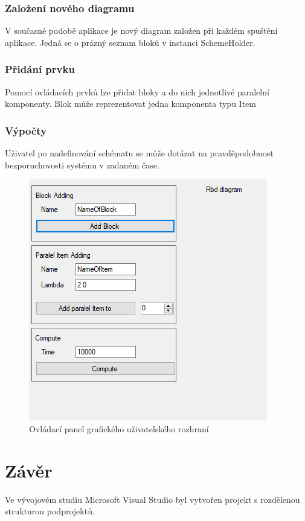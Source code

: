 \documentclass[FM,RP]{tulthesis}
\begin{document}
    \subsection*{Založení nového diagramu}
        V současné podobě aplikace je nový diagram založen při každém spuštění aplikace. Jedná se o prázný seznam bloků v instanci SchemeHolder.
    \subsection*{Přidání prvku}
        Pomocí ovládacích prvků lze přidat bloky a do nich jednotlivé paralelní komponenty. Blok může reprezentovat jedna komponenta typu Item
    \subsection*{Výpočty}
        Uživatel po nadefinování schématu se může dotázat na pravděpodobnost bezporuchovosti systému v zadaném čase.
    \begin{figure}[h]
        \centering
        \includegraphics[scale=1]{pic/gui.png}
        \caption{Ovládací panel grafického uživatelského rozhraní} 
    \end{figure}


\chapter{Závěr}
    Ve vývojovém studiu Microsoft Visual Studio byl vytvořen projekt s rozdělenou strukturou podprojektů.
\end{document}
